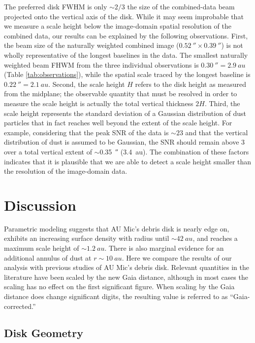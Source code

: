 \documentclass[modern]{aastex62}
\begin{document}
The preferred disk FWHM is only $\sim 2/3$ the size of the combined-data beam projected onto the vertical axis of the disk.
While it may seem improbable that we measure a scale height below the image-domain spatial resolution of the combined data, our results can be explained by the following observations.
First, the beam size of the naturally weighted combined image ($\SI{0.52}{\arcsecond} \times \SI{0.39}{\arcsecond}$) is not wholly representative of the longest baselines in the data. 
The smallest naturally weighted beam FHWM from the three individual observations is $\SI{0.30}{\arcsecond} = \SI{2.9}{au}$ (Table \ref{tab:observations}), while the spatial scale traced by the longest baseline is $\SI{0.22}{\arcsecond} = \SI{2.1}{au}$.
Second, the scale height $H$ refers to the disk height as measured from the midplane; the observable quantity that must be resolved in order to measure the scale height is actually the total vertical thickness $2H$.
Third, the scale height represents the standard deviation of a Gaussian distribution of dust particles that in fact reaches well beyond the extent of the scale height.
For example, considering that the peak SNR of the data is $\sim 23$ and that the vertical distribution of dust is assumed to be Gaussian, the SNR should remain above 3 over a total vertical extent of $\sim$\SI{0.35}{\arcsecond} (\SI{3.4}{au}). 
The combination of these factors indicates that it is plausible that we are able to detect a scale height smaller than the resolution of the image-domain data.


\section{Discussion}
\label{section: discussion}

Parametric modeling suggests that AU Mic's debris disk is nearly edge on, exhibits an increasing surface density with radius until $\sim\SI{42}{au}$, and reaches a maximum scale height of $\sim\SI{1.2}{au}$.
There is also marginal evidence for an additional annulus of dust at $r \sim \SI{10}{au}$.
Here we compare the results of our analysis with previous studies of AU Mic's debris disk.
Relevant quantities in the literature have been scaled by the new Gaia distance, although in most cases the scaling has no effect on the first significant figure.
When scaling by the Gaia distance does change significant digits, the resulting value is referred to as ``Gaia-corrected.''

\subsection{Disk Geometry}
\label{subsection: disk geometry}
\end{document}
